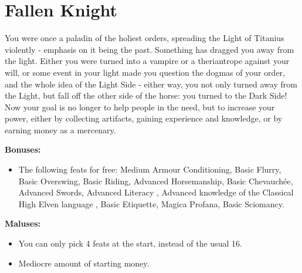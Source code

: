 \section{Fallen Knight}
You were once a paladin of the holiest orders, spreading the Light of Titanius violently - emphasis on it being the past. Something has dragged you away from the light. Either you were turned into a vampire or a theriantrope against your will, or some event in your light made you question the dogmas of your order, and the whole idea of the Light Side - either way, you not only turned away from the Light, but fall off the other side of the horse: you turned to the Dark Side! Now your goal is no longer to help people in the need, but to increase your power, either by collecting artifacts, gaining experience and knowledge, or by earning money as a mercenary.


\textbf{Bonuses:}
\begin{itemize}
	\item The following feats for free: Medium Armour Conditioning, Basic Flurry, Basic Overswing, Basic Riding, Advanced Horsemanship, Basic Chevauchée, Advanced Swords, Advanced Literacy , Advanced knowledge of the Classical High Elven language , Basic Etiquette, Magica Profana, Basic Sciomancy.
\end{itemize}


\textbf{Maluses:}
\begin{itemize}
	\item You can only pick 4 feats at the start, instead of the usual 16.
	\item Mediocre amount of starting money.
\end{itemize}
